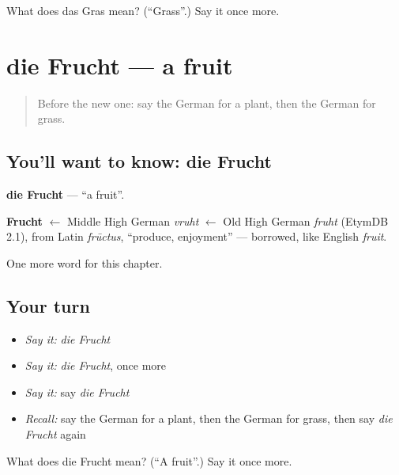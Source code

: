 \begin{tcolorbox}[breakable,colback=teal!4,colframe=teal!35!black,title={Before you move on}]
What does das Gras mean? (\textquotedblleft{}Grass\textquotedblright{}.) Say it once more.
\end{tcolorbox}
\section[die Frucht]{die Frucht — a fruit}

\label{lesson:GE-C199-frucht}



\begin{quote}
Before the new one: say the German for a plant, then the German for grass.
\end{quote}

\subsection*{You'll want to know: die Frucht}
\textbf{die Frucht} — \textquotedblleft{}a fruit\textquotedblright{}.

\begin{cousinweb}
\textbf{Frucht} $\leftarrow$ Middle High German \emph{vruht} $\leftarrow$ Old High German \emph{fruht} (EtymDB 2.1), from Latin \emph{frūctus}, \textquotedblleft{}produce, enjoyment\textquotedblright{} — borrowed, like English \emph{fruit}.
\end{cousinweb}

\begin{grammarlens}[title={What you've built}]
One more word for this chapter.
\end{grammarlens}

\subsection*{Your turn}
\begin{itemize}
\raggedright
  \item \emph{Say it:} \emph{die Frucht}
  \item \emph{Say it:} \emph{die Frucht}, once more
  \item \emph{Say it:} say \emph{die Frucht}
  \item \emph{Recall:} say the German for a plant, then the German for grass, then say \emph{die Frucht} again
\end{itemize}

\begin{tcolorbox}[breakable,colback=teal!4,colframe=teal!35!black,title={Before you move on}]
What does die Frucht mean? (\textquotedblleft{}A fruit\textquotedblright{}.) Say it once more.
\end{tcolorbox}
